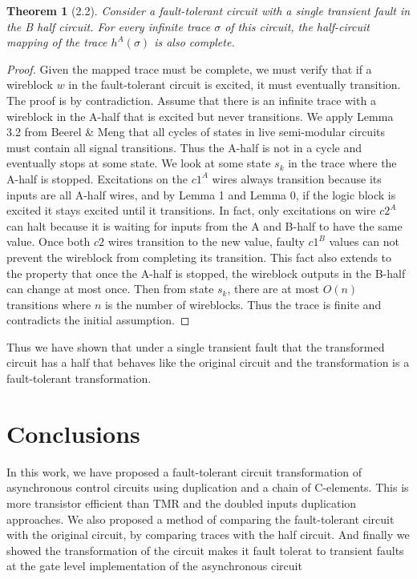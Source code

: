 \documentclass[12pt]{report}
\newtheorem*{theorem}{Theorem}
\begin{document}
\begin{theorem}[2.2]
Consider a fault-tolerant circuit with a single transient fault in the B half circuit.  For every infinite trace $\sigma$ of this circuit, the half-circuit mapping of the trace $h^{A}(\sigma)$ is also complete.  
\end{theorem}
\begin{proof}
Given the mapped trace must be complete, we must verify that if a wireblock $w$ in the fault-tolerant circuit is excited, it must eventually transition.  The proof is by contradiction.  Assume that there is an infinite trace with a wireblock in the A-half that is excited but never transitions.  We apply Lemma 3.2 from Beerel & Meng that all cycles of states in live semi-modular circuits must contain all signal transitions.  Thus the A-half is not in a cycle and eventually stops at some state.  We look at some state $s_k$ in the trace where the A-half is stopped.  Excitations on the $c1^A$ wires always transition because its inputs are all A-half wires, and by Lemma 1 and Lemma 0, if the logic block is excited it stays excited until it transitions.  In fact, only excitations on wire $c2^A$ can halt because it is waiting for inputs from the A and B-half to have the same value.  Once both $c2$ wires transition to the new value, faulty $c1^B$ values can not prevent the wireblock from completing its transition.  This fact also extends to the property that once the A-half is stopped, the wireblock outputs in the B-half can change at most once.  Then from state $s_k$, there are at most $O(n)$ transitions where $n$ is the number of wireblocks.  Thus the trace is finite and contradicts the initial assumption.

\end{proof}

Thus we have shown that under a single transient fault that the transformed circuit has a half that behaves like the original circuit and the transformation is a fault-tolerant transformation.


\chapter{Conclusions}
In this work, we have proposed a fault-tolerant circuit transformation of asynchronous control circuits using duplication and a chain of C-elements.  This is more transistor efficient than TMR and the doubled inputs duplication approaches.  We also proposed a method of comparing the fault-tolerant circuit with the original circuit, by comparing traces with the half circuit.  And finally we showed the transformation of the circuit makes it fault tolerat to transient faults at the gate level implementation of the asynchronous circuit\\
\end{document}
